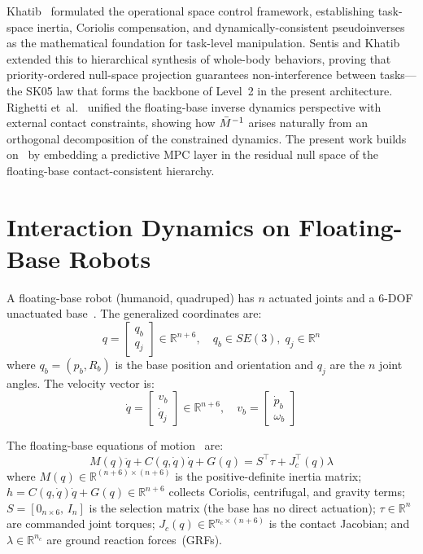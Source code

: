 Khatib~\cite{khatib1987unified} formulated the operational space control
framework, establishing task-space inertia, Coriolis compensation, and
dynamically-consistent pseudoinverses as the mathematical foundation for
task-level manipulation.
Sentis and Khatib~\cite{sentis2005synthesis} extended this to hierarchical
synthesis of whole-body behaviors, proving that priority-ordered null-space
projection guarantees non-interference between tasks---the SK05 law that
forms the backbone of Level~2 in the present architecture.
Righetti et~al.~\cite{righetti2011inverse} unified the floating-base
inverse dynamics perspective with external contact constraints, showing how
$\bar{M}^{-1}$ arises naturally from an orthogonal decomposition of the constrained
dynamics.
The present work builds on~\cite{khatib1987unified,sentis2005synthesis,righetti2011inverse}
by embedding a predictive MPC layer in the residual null space of the
floating-base contact-consistent hierarchy.

\section{Interaction Dynamics on Floating-Base Robots}\label{sec:dynamics}

A floating-base robot (humanoid, quadruped) has $n$ actuated joints and a
6-DOF unactuated base~\cite{righetti2011inverse}. The generalized
coordinates are:
\begin{equation}\label{eq:gencoord}
  q = \begin{bmatrix} q_b \\ q_j \end{bmatrix} \in \mathbb{R}^{n+6},
  \quad q_b \in SE(3),\; q_j \in \mathbb{R}^n
\end{equation}
where $q_b=(p_b,R_b)$ is the base position and orientation and $q_j$ are
the $n$ joint angles. The velocity vector is:
\begin{equation}\label{eq:vel}
  \dot{q} = \begin{bmatrix} v_b \\ \dot{q}_j \end{bmatrix} \in \mathbb{R}^{n+6},
  \quad v_b = \begin{bmatrix} \dot{p}_b \\ \omega_b \end{bmatrix}
\end{equation}

The floating-base equations of motion~\cite{righetti2011inverse} are:
\begin{equation}\label{eq:eom}
  M(q)\ddot{q} + C(q,\dot{q})\dot{q} + G(q) = S^\top\tau + J_c^\top(q)\lambda
\end{equation}
where $M(q)\in\mathbb{R}^{(n+6)\times(n+6)}$ is the positive-definite
inertia matrix; $h=C(q,\dot{q})\dot{q}+G(q)\in\mathbb{R}^{n+6}$ collects
Coriolis, centrifugal, and gravity terms; $S=[0_{n\times6},\,I_n]$ is the
selection matrix (the base has no direct actuation); $\tau\in\mathbb{R}^n$
are commanded joint torques; $J_c(q)\in\mathbb{R}^{n_c\times(n+6)}$ is the
contact Jacobian; and $\lambda\in\mathbb{R}^{n_c}$ are ground reaction
forces~(GRFs).

